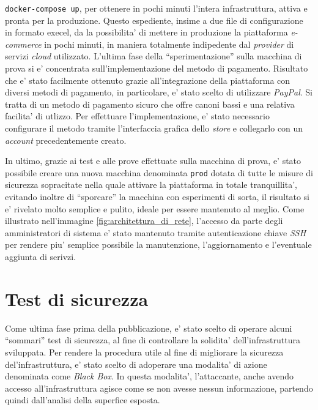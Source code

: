 \documentclass[a4paper]{report}
\newcommand{\quotes}[1]{``#1''}
\begin{document}
		\texttt{docker-compose up}, per ottenere in pochi minuti l'intera infrastruttura, attiva e pronta per la
		produzione.  Questo espediente, insime a due file di configurazione in formato execel, da la possibilita' di
		mettere in produzione la piattaforma \emph{ e-commerce} in pochi minuti, in maniera totalmente indipedente dal
		\emph{provider} di servizi \emph{cloud} utilizzato.
		L'ultima fase della \quotes{sperimentazione} sulla macchina di prova si e' concentrata sull'implementazione del
		metodo di pagamento. Risultato che e' stato facilmente ottenuto grazie all'integrazione della piattaforma con
		diversi metodi di pagamento, in particolare, e' stato scelto di utilizzare \emph{PayPal}. Si tratta di un metodo
		di pagamento sicuro che offre canoni bassi e una relativa facilita' di utlizzo. Per effettuare
		l'implementazione, e' stato necessario configurare il metodo tramite l'interfaccia grafica dello \emph{store} e
		collegarlo con un \emph{account} precedentemente creato.

		In ultimo, grazie ai test e alle prove effettuate sulla macchina di prova, e' stato possibile creare una nuova
		macchina denominata \texttt{prod} dotata di tutte le misure di sicurezza sopracitate nella quale attivare la
		piattaforma in totale tranquillita', evitando inoltre di \quotes{sporcare} la macchina con esperimenti di sorta,
		il risultato si e' rivelato molto semplice e pulito, ideale per essere mantenuto al meglio. Come illustrato
		nell'immagine \ref{fig:architettura_di_rete}, l'accesso da parte degli amministratori di sistema e' stato
		mantenuto tramite autenticazione chiave \emph{SSH} per rendere piu' semplice possibile la manutenzione,
		l'aggiornamento e l'eventuale aggiunta di serivzi.

	\section{Test di sicurezza}\label{test_di_sicurezza}
		Come ultima fase prima della pubblicazione, e' stato scelto di operare alcuni \quotes{sommari} test di
		sicurezza, al fine di controllare la solidita' dell'infrastruttura sviluppata.
		Per rendere la procedura utile al fine di migliorare la sicurezza del'infrastruttura, e' stato scelto di
		adoperare una modalita' di azione denominata come \emph{Black Box}. In questa modalita', l'attaccante, anche
		avendo accesso all'infrastruttura agisce come se non avesse nessun informazione, partendo quindi dall'analisi
		della superfice esposta.
\end{document}
